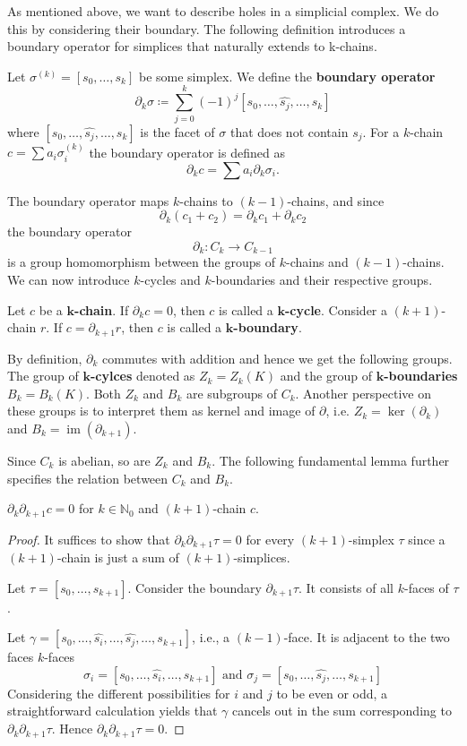 As mentioned above, we want to describe holes in a simplicial complex. We do this by considering their boundary. The following definition introduces a boundary operator for simplices that naturally extends to k-chains. 

\begin{defi}
Let $\sigma^{(k)} = [s_0,\dots,s_k]$ be some simplex. We define the \textbf{boundary operator}
\[
\partial_k \sigma \coloneqq \sum_{j=0}^{k}(-1)^j[s_0,\dots,\hat{s_j},\dots,s_k]
\]
where $[s_0,\dots,\hat{s_j},\dots,s_k]$ is the facet of $\sigma$ that does not contain $s_j$. For a $k$-chain $c = \sum a_i \sigma_i^{(k)}$ the boundary operator is defined as
\[
\partial_k c = \sum a_i \partial_k \sigma_i.
\]
\end{defi}
The boundary operator maps $k$-chains to $(k-1)$-chains, and since 
\[\partial_k (c_1 + c_2) = \partial_k c_1 + \partial_k c_2\]
the boundary operator 
\[
    \partial_k: C_k \rightarrow C_{k-1}
\]
is a group homomorphism between the groups of $k$-chains and $(k-1)$-chains. We can now introduce $k$-cycles and $k$-boundaries and their respective groups. 

\begin{defi}
Let $c$ be a $\bm{k}$\textbf{-chain}. If $\partial_kc = 0$, then $c$ is called a $\bm{k}$\textbf{-cycle}. Consider a $(k+1)$-chain $r$. If $c = \partial_{k+1}r$, then $c$ is called a $\bm{k}$\textbf{-boundary}. 
\end{defi}

By definition, $\partial_k$ commutes with addition and hence we get the following groups.
The group of $\bm{k}$\textbf{-cylces} denoted as $Z_k = Z_k(K)$ and the group of $\bm{k}$\textbf{-boundaries} $B_k = B_k(K)$. Both $Z_k$ and $B_k$ are subgroups of $C_k$. Another perspective on these groups is to interpret them as kernel and image of $\partial$, i.e. $Z_k = \operatorname{ker}(\partial_k)$ and $B_k = \operatorname{im}(\partial_{k+1})$.

Since $C_k$ is abelian, so are $Z_k$ and $B_k$. The following fundamental lemma further specifies the relation between $C_k$ and $B_k$.

\begin{lemma}
$\partial_k \partial_{k+1} c = 0$ for $k \in \mathbb{N}_0$ and $(k+1)$-chain $c$. 
\end{lemma}
\begin{proof}
It suffices to show that $\partial_k \partial_{k+1} \tau = 0$ for every $(k+1)$-simplex $\tau$ since a $(k+1)$-chain is just a sum of $(k+1)$-simplices. 

Let $\tau = [s_0,\dots,s_{k+1}]$. Consider the boundary $\partial_{k+1}\tau$. It consists of all $k$-faces of $\tau$.

Let $\gamma = [s_0,\dots,\hat{s_i},\dots,\hat{s_j},\dots,s_{k+1}]$, i.e., a $(k-1)$-face. It is adjacent to the two faces $k$-faces \[\sigma_i = [s_0,\dots,\hat{s_i},\dots,s_{k+1}] \text{ and }\sigma_j = [s_0,\dots,\hat{s_j},\dots,s_{k+1}]\]
Considering the different possibilities for $i$ and $j$ to be even or odd, a straightforward calculation yields that $\gamma$ cancels out in the sum corresponding to $\partial_k \partial_{k+1} \tau$. Hence $\partial_k \partial_{k+1} \tau = 0$.
\end{proof}

